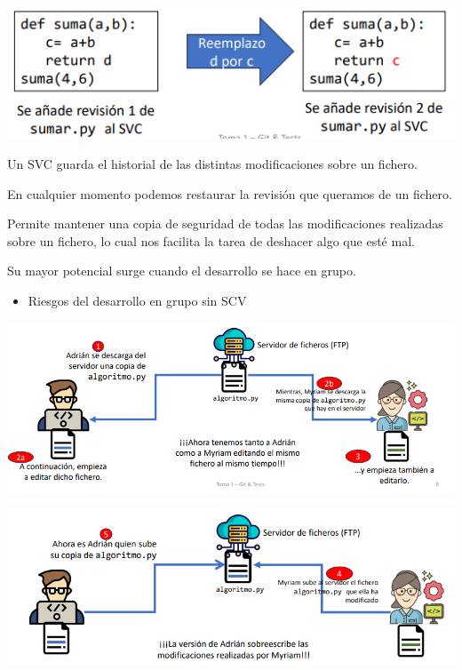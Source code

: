 \begin{center}
	\includegraphics{"Temas/Tema 1/screenshot001"}
\end{center}


Un SVC guarda el historial de las distintas modificaciones sobre un fichero.

En cualquier momento podemos restaurar la revisión que queramos de un fichero.

Permite mantener una copia de seguridad de todas las modificaciones realizadas sobre un fichero, lo cual nos facilita la tarea de deshacer algo que esté mal.

Su mayor potencial surge cuando el desarrollo se hace en grupo.

\begin{itemize}[label=\color{red}\textbullet, leftmargin=*]
	\item \color{lightblue}Riesgos del desarrollo en grupo sin SCV
\end{itemize}
\begin{center}
	\includegraphics{"Temas/Tema 1/screenshot002"}
	
	\includegraphics{"Temas/Tema 1/screenshot003"}
\end{center}
